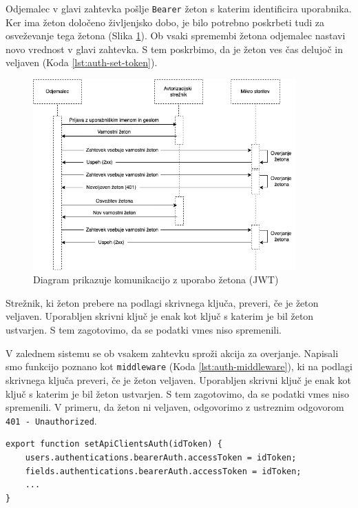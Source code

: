 \documentclass[a4paper, 12pt]{book}
\begin{document}
Odjemalec v glavi zahtevka pošlje \verb=Bearer= žeton s katerim identificira uporabnika. Ker ima žeton določeno življenjsko dobo, je bilo potrebno poskrbeti tudi za osveževanje tega žetona (Slika \ref{token-flow}). Ob vsaki spremembi žetona odjemalec nastavi novo vrednost v glavi zahtevka. S tem poskrbimo, da je žeton ves čas delujoč in veljaven (Koda \ref{lst:auth-set-token}).

\begin{figure}[h]
\begin{center}
\includegraphics[width=0.9\textwidth]{slike/token-flow.png}
\end{center}
\caption{ Diagram prikazuje komunikacijo z uporabo žetona (JWT) }
\label{token-flow}
\end{figure}

Strežnik, ki žeton prebere na podlagi skrivnega ključa, preveri, če je žeton veljaven. Uporabljen skrivni ključ je enak kot ključ s katerim je bil žeton ustvarjen. S tem zagotovimo, da se podatki vmes niso spremenili.

V zalednem sistemu se ob vsakem zahtevku sproži akcija za overjanje. Napisali smo funkcijo poznano kot \verb=middleware= (Koda \ref{lst:auth-middleware}), ki na podlagi skrivnega ključa preveri, če je žeton veljaven. Uporabljen skrivni ključ je enak kot ključ s katerim je bil žeton ustvarjen. S tem zagotovimo, da se podatki vmes niso spremenili. V primeru, da žeton ni veljaven, odgovorimo z ustreznim odgovorom \verb=401 - Unauthorized=. 

\begin{lstlisting}[style=mystyle,caption={Izsek kode za nastavljanje žetona posameznemu odjemalcu},label=lst:auth-set-token]
export function setApiClientsAuth(idToken) {
    users.authentications.bearerAuth.accessToken = idToken;
    fields.authentications.bearerAuth.accessToken = idToken;
    ...
}
\end{lstlisting}
\end{document}
